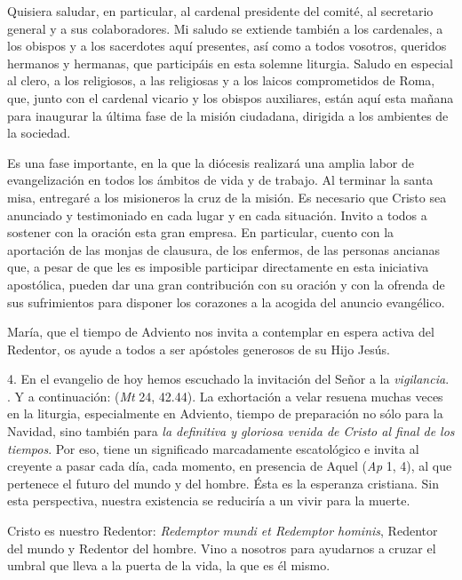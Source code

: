 \begin{body}
				Quisiera saludar, en particular, al cardenal presidente del comité, al secretario general y a sus colaboradores. Mi saludo se extiende también a los cardenales, a los obispos y a los sacerdotes aquí presentes, así como a todos vosotros, queridos hermanos y hermanas, que participáis en esta solemne liturgia. Saludo en especial al clero, a los religiosos, a las religiosas y a los laicos comprometidos de Roma, que, junto con el cardenal vicario y los obispos auxiliares, están aquí esta mañana para inaugurar la última fase de la misión ciudadana, dirigida a los ambientes de la sociedad. 
				
				Es una fase importante, en la que la diócesis realizará una amplia labor de evangelización en todos los ámbitos de vida y de trabajo. Al terminar la santa misa, entregaré a los misioneros la cruz de la misión. Es necesario que Cristo sea anunciado y testimoniado en cada lugar y en cada situación. Invito a todos a sostener con la oración esta gran empresa. En particular, cuento con la aportación de las monjas de clausura, de los enfermos, de las personas ancianas que, a pesar de que les es imposible participar directamente en esta iniciativa apostólica, pueden dar una gran contribución con su oración y con la ofrenda de sus sufrimientos para disponer los corazones a la acogida del anuncio evangélico. 
				
				María, que el tiempo de Adviento nos invita a contemplar en espera activa del Redentor, os ayude a todos a ser apóstoles generosos de su Hijo Jesús. 
				
				4. En el evangelio de hoy hemos escuchado la invitación del Señor a la \emph{vigilancia}. . Y a continuación:  (\emph{Mt} 24, 42.44). La exhortación a velar resuena muchas veces en la liturgia, especialmente en Adviento, tiempo de preparación no sólo para la Navidad, sino también para \emph{la definitiva y gloriosa venida de Cristo al final de los tiempos}. Por eso, tiene un significado marcadamente escatológico e invita al creyente a pasar cada día, cada momento, en presencia de Aquel  (\emph{Ap} 1, 4), al que pertenece el futuro del mundo y del hombre. Ésta es la esperanza cristiana. Sin esta perspectiva, nuestra existencia se reduciría a un vivir para la muerte. 
				
				Cristo es nuestro Redentor: \emph{Redemptor mundi et Redemptor hominis}, Redentor del mundo y Redentor del hombre. Vino a nosotros para ayudarnos a cruzar el umbral que lleva a la puerta de la vida, la  que es él mismo. 
				

\end{body}
